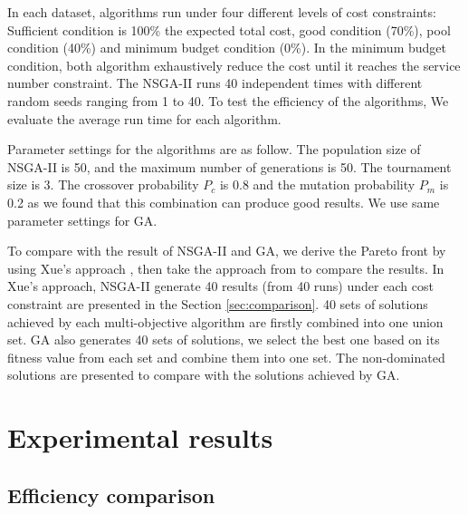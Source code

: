 \documentclass{llncs}
\begin{document}
In each dataset, algorithms run under four different levels of cost constraints: Sufficient condition is 100\% the expected total cost, 
good condition (70\%), pool condition (40\%) and minimum budget condition (0\%). In the minimum budget condition, 
both algorithm exhaustively reduce the cost until it reaches the service number constraint. The NSGA-II runs 40 independent times with different random 
seeds ranging from 1 to 40. To test the efficiency of the algorithms, We evaluate the average run time for each algorithm. 


Parameter settings for the algorithms are as follow. The population size of NSGA-II is 50, and the maximum number of 
generations is 50. The tournament size is 3. 
The crossover probability $P_{c}$ is 0.8 and the mutation probability $P_{m}$ 
is 0.2 as we found that this combination can produce good results. We use same parameter settings for GA. 

To compare with the result of NSGA-II and GA, we derive the Pareto front by using Xue's approach \cite{Xue}, then take the approach from \cite{1688438} to compare the results.
In Xue's approach, NSGA-II generate 40 results (from 40 runs) under each cost constraint 
are presented in the Section \ref{sec:comparison}. 40 sets of solutions 
achieved by each multi-objective algorithm are firstly combined into one union set. GA also generates 40 sets of 
solutions, we select the best one based on its fitness value from each set and combine them into one set. 
The non-dominated solutions are presented to compare with the solutions achieved by GA.


\section{Experimental results}
\label{sec:results}
\subsection{Efficiency comparison}
\end{document}
